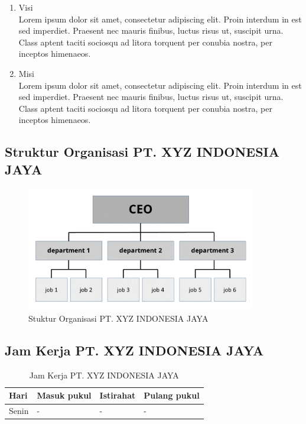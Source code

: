 \begin{enumerate}
    \item Visi \\
          Lorem ipsum dolor sit amet, consectetur adipiscing elit. Proin interdum in est sed imperdiet. Praesent nec mauris finibus, luctus risus ut, suscipit urna. Class aptent taciti sociosqu ad litora torquent per conubia nostra, per inceptos himenaeos.
    \item Misi \\
          Lorem ipsum dolor sit amet, consectetur adipiscing elit. Proin interdum in est sed imperdiet. Praesent nec mauris finibus, luctus risus ut, suscipit urna. Class aptent taciti sociosqu ad litora torquent per conubia nostra, per inceptos himenaeos.
\end{enumerate}

\subsection{Struktur Organisasi PT. XYZ INDONESIA JAYA}

\begin{figure}[H]
    \centering
    \includegraphics[width=10cm]{assets/pics/dummy-organizational-chart.png}
    \caption{Stuktur Organisasi PT. XYZ INDONESIA JAYA}
    \label{fig:organizationalChart}
\end{figure}



\subsection{Jam Kerja PT. XYZ INDONESIA JAYA}

\begin{table}[ht!]
    \centering
    \begin{tabular}{|l|l|l|l|}
        \hline
        \textbf{Hari} & \textbf{Masuk pukul} & \textbf{Istirahat} & \textbf{Pulang pukul} \\ \hline
        Senin         & -                    & -                  & -                     \\ \hline
    \end{tabular}
    \caption{Jam Kerja PT. XYZ INDONESIA JAYA}
    \label{tab:workingDays}
\end{table}